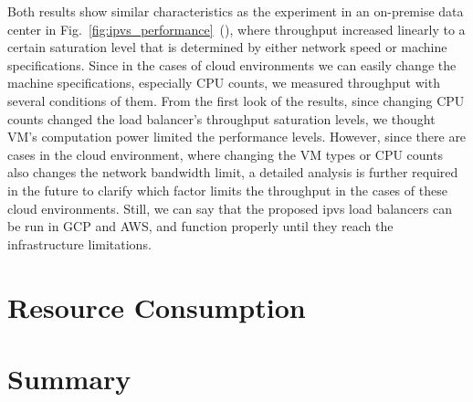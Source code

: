 Both results show similar characteristics as the experiment in an on-premise data center in Fig.~\ref{fig:ipvs_performance}~(), where throughput increased linearly to a certain saturation level that is determined by either network speed or machine specifications.
Since in the cases of cloud environments we can easily change the machine specifications, especially CPU counts, we measured throughput with several conditions of them.
From the first look of the results, since changing CPU counts changed the load balancer's throughput saturation levels, we thought VM's computation power limited the performance levels.
However, since there are cases in the cloud environment, where changing the VM types or CPU counts also changes the network bandwidth limit, a detailed analysis is further required in the future to clarify which factor limits the throughput in the cases of these cloud environments.
Still, we can say that the proposed ipvs load balancers can be run in GCP and AWS, and function properly until they reach the infrastructure limitations.

\section{Resource Consumption}

\section{Summary}



